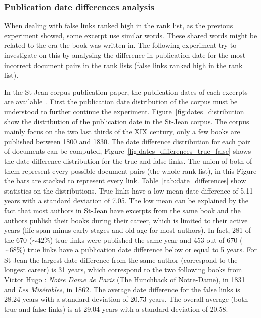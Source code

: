 \subsubsection{Publication date differences analysis}

When dealing with false links ranked high in the rank list, as the previous experiment showed, some excerpt use similar words.
These shared words might be related to the era the book was written in.
The following experiment try to investigate on this by analysing the difference in publication date for the most incorrect document pairs in the rank lists (false links ranked high in the rank list).

In the St-Jean corpus publication paper, the publication dates of each excerpts are available~\cite{st_jean}.
First the publication date distribution of the corpus must be understood to further continue the experiment.
Figure~\ref{fig:dates_distribution} show the distribution of the publication date in the St-Jean corpus.
The corpus mainly focus on the two last thirds of the XIX century, only a few books are published between 1800 and 1830.
The date difference distribution for each pair of documents can be computed, Figure~\ref{fig:dates_differences_true_false} shows the date difference distribution for the true and false links.
The union of both of them represent every possible document pairs (the whole rank list), in this Figure the bars are stacked to represent every link.
Table~\ref{tab:date_differences} show statistics on the distributions.
True links have a low mean date difference of 5.11 years with a standard deviation of 7.05.
The low mean can be explained by the fact that most authors in St-Jean have excerpts from the same book and the authors publish their books during their career, which is limited to their active years (life span minus early stages and old age for most authors).
In fact, 281 of the 670 ($\sim 42\%$) true links were published the same year and 453 out of 670 ($\sim 68\%$) true links have a publication date difference below or equal to 5 years.
For St-Jean the largest date difference from the same author (correspond to the longest career) is 31 years, which correspond to the two following books  from Victor Hugo : \textit{Notre Dame de Paris} (The Hunchback of Notre-Dame), in 1831 and \textit{Les Misérables}, in 1862.
The average date difference for the false links is 28.24 years with a standard deviation of 20.73 years.
The overall average (both true and false links) is at 29.04 years with a standard deviation of 20.58.

